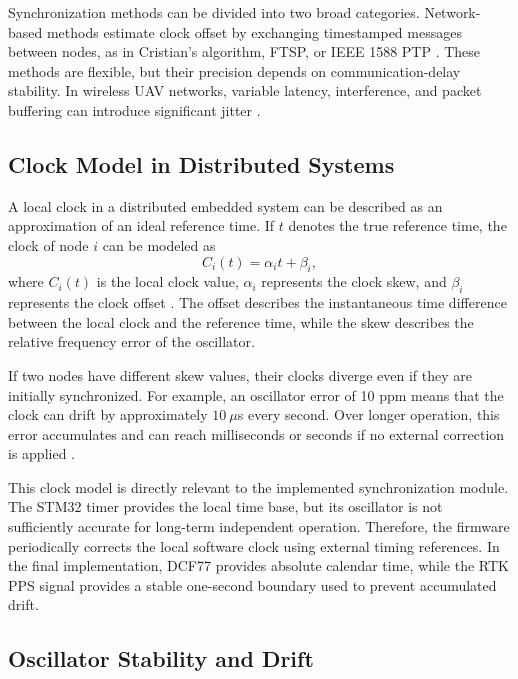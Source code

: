 Synchronization methods can be divided into two broad categories. Network-based methods estimate clock offset by exchanging timestamped messages between nodes, as in Cristian's algorithm, FTSP, or IEEE 1588 PTP \cite{cristian1989probabilistic,maroti2004ftsp,ieee1588}. These methods are flexible, but their precision depends on communication-delay stability. In wireless UAV networks, variable latency, interference, and packet buffering can introduce significant jitter \cite{lopez2021uavmesh}.

\subsection{Clock Model in Distributed Systems}

A local clock in a distributed embedded system can be described as an approximation of an ideal reference time. If $t$ denotes the true reference time, the clock of node $i$ can be modeled as
\begin{equation}
C_i(t) = \alpha_i t + \beta_i ,
\end{equation}
where $C_i(t)$ is the local clock value, $\alpha_i$ represents the clock skew, and $\beta_i$ represents the clock offset \cite{kopetz2011realtime,lamport1978time}. The offset describes the instantaneous time difference between the local clock and the reference time, while the skew describes the relative frequency error of the oscillator.

If two nodes have different skew values, their clocks diverge even if they are initially synchronized. For example, an oscillator error of 10 ppm means that the clock can drift by approximately $10~\mu$s every second. Over longer operation, this error accumulates and can reach milliseconds or seconds if no external correction is applied \cite{allan1966statistics,levine2012atomic}.

This clock model is directly relevant to the implemented synchronization module. The STM32 timer provides the local time base, but its oscillator is not sufficiently accurate for long-term independent operation. Therefore, the firmware periodically corrects the local software clock using external timing references. In the final implementation, DCF77 provides absolute calendar time, while the RTK PPS signal provides a stable one-second boundary used to prevent accumulated drift.

\subsection{Oscillator Stability and Drift}

